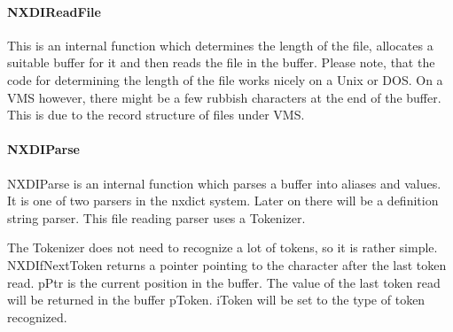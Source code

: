 \documentclass[12pt]{article}
\begin{document}
\paragraph{NXDIReadFile}
This is an internal function which determines the length of the file,
allocates a suitable buffer for it and then reads the file in the buffer.
Please note, that the code for determining the length of the file works
nicely on a Unix or DOS. On a VMS however, there might be a few rubbish
characters at the end of the buffer. This is due to the record structure of
files under VMS. 

\paragraph{NXDIParse}
NXDIParse is an internal function which parses a buffer into aliases and
values. It is one of two parsers in the nxdict system. Later on there will
be a definition string parser.  This file reading parser uses a 
Tokenizer.

The Tokenizer does not need to recognize a lot of
tokens, so it is rather simple. NXDIfNextToken returns a pointer pointing to
the character after the last token read. pPtr is the current position in
the buffer. The value of the last token read will be returned in the buffer
pToken. iToken will be set to the type of token recognized.
  
\end{document}
